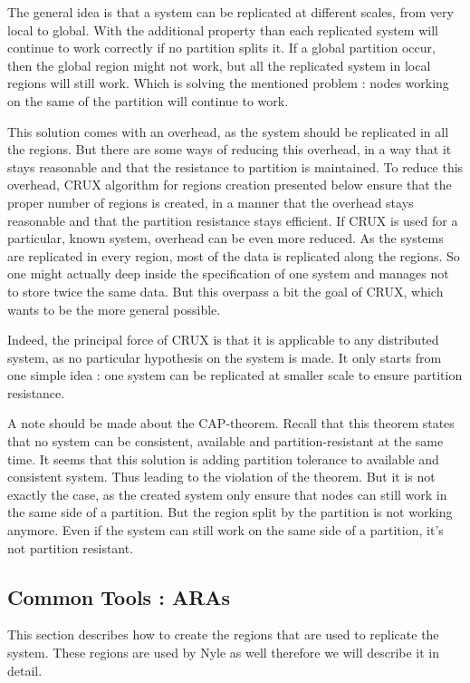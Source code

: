 \documentclass[a4paper,11pt,oneside]{report}
\begin{document}
The general idea is that a system can be replicated at different scales, from
very local to global.  With the additional property than each replicated system
will continue to work correctly if no partition splits it. If a global
partition occur, then the global region might not work, but all the replicated
system in local regions will still work. Which is solving the mentioned problem
: nodes working on the same of the partition will continue to work.

This solution comes with an overhead, as the system should be replicated in all
the regions. But there are some ways of reducing this overhead, in a way that
it stays reasonable and that the resistance to partition is maintained. To
reduce this overhead, CRUX algorithm for regions creation presented below
ensure that the proper number of regions is created, in a manner that the
overhead stays reasonable and that the partition resistance stays efficient. If
CRUX is used for a particular, known system, overhead can be even more reduced.
As the systems are replicated in every region, most of the data is replicated
along the regions. So one might actually deep inside the specification of one
system and manages not to store twice the same data. But this overpass a bit
the goal of CRUX, which wants to be the more general possible. 

Indeed, the principal force of CRUX is that it is applicable to any distributed
system, as no particular hypothesis on the system is made. It only starts from
one simple idea : one system can be replicated at smaller scale to ensure
partition resistance. 

A note should be made about the CAP-theorem. Recall that this theorem states
that no system can be consistent, available and partition-resistant at the same
time. It seems that this solution is adding partition tolerance to available
and consistent system. Thus leading to the violation of the theorem. But it is
not exactly the case, as the created system only ensure that nodes can still
work in the same side of a partition. But the region split by the partition is
not working anymore. Even if the system can still work on the same side of a
partition, it's not partition resistant.

\subsection{Common Tools :  ARAs} This section describes how to create the
regions that are used to replicate the system. These regions are used by Nyle
as well therefore we will describe it in detail. 
\end{document}

